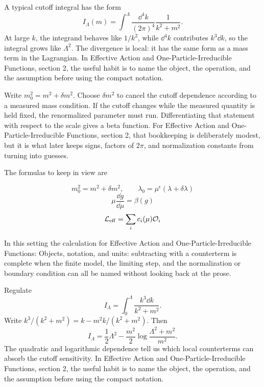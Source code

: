 A typical cutoff integral has the form
\[
  I_\Lambda(m)=\int^{\Lambda}\frac{\dd^4k}{(2\pi)^4}\frac{1}{k^2+m^2}.
\]
At large \(k\), the integrand behaves like \(1/k^2\), while \(\dd^4k\) contributes \(k^3\dd k\), so the integral grows like \(\Lambda^2\).  The divergence is local: it has the same form as a mass term in the Lagrangian.  In Effective Action and One-Particle-Irreducible Functions, section 2, the useful habit is to name the object, the operation, and the assumption before using the compact notation.

Write \(m_0^2=m^2+\delta m^2\).  Choose \(\delta m^2\) to cancel the cutoff dependence according to a measured mass condition.  If the cutoff changes while the measured quantity is held fixed, the renormalized parameter must run.  Differentiating that statement with respect to the scale gives a beta function.  For Effective Action and One-Particle-Irreducible Functions, section 2, that bookkeeping is deliberately modest, but it is what later keeps signs, factors of \(2\pi\), and normalization constants from turning into guesses.

The formulas to keep in view are

\[
  m_0^2=m^2+\delta m^2,\qquad \lambda_0=\mu^\epsilon(\lambda+\delta\lambda)
\]
\[
  \mu\frac{\dd g}{\dd\mu}=\beta(g)
\]
\[
  \mathcal L_{\mathrm{eff}}=\sum_i c_i(\mu)\mathcal O_i
\]

In this setting the calculation for Effective Action and One-Particle-Irreducible Functions: Objects, notation, and units: subtracting with a counterterm is complete when the finite model, the limiting step, and the normalization or boundary condition can all be named without looking back at the prose.




\begin{example}
Regulate
\[
  I_\Lambda=\int_0^\Lambda\frac{k^3\dd k}{k^2+m^2}.
\]
Write \(k^3/(k^2+m^2)=k-m^2k/(k^2+m^2)\).  Then
\[
  I_\Lambda=\frac12\Lambda^2-\frac{m^2}{2}\log\frac{\Lambda^2+m^2}{m^2}.
\]
The quadratic and logarithmic dependence tell us which local counterterms can absorb the cutoff sensitivity.  In Effective Action and One-Particle-Irreducible Functions, section 2, the useful habit is to name the object, the operation, and the assumption before using the compact notation.
\end{example}



